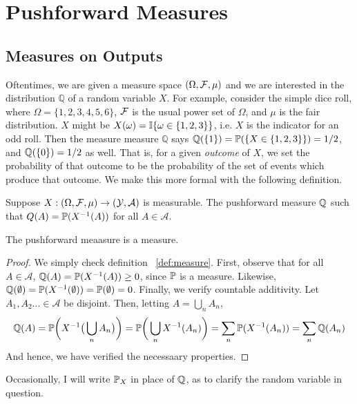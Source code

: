 \section{Pushforward Measures}

\subsection{Measures on Outputs}

Oftentimes, we are given a measure space $ (\Omega, \mathcal F, \mu)$ and we are interested in the distribution $\mathbb Q$ of a random variable $X$.
For example, consider the simple dice roll, where $\Omega = \{1,2,3,4,5,6\}$, $\mathcal F$ is the usual 
power set of $\Omega$, and $\mu$ is the fair distribution. $X$ might be $X(\omega) = \mathbb I\{\omega \in \{1,2,3\}\}$, i.e. 
$X$ is the indicator for an odd roll. Then the measure measure $\mathbb Q$ says $\mathbb Q(\{1\}) = \mathbb P(\{X \in \{1,2,3\} \}) = 1/2$, 
and $\mathbb Q(\{0\}) = 1/2$ as well. That is, for a given \emph{outcome} of $X$, we set the probability of that outcome to 
be the probability of the set of events which produce that outcome. We make this more formal with the following 
definition.

\begin{definition}
    Suppose $X : (\Omega, \mathcal F, \mu) \to (\mathcal Y, \mathcal A)$ is measurable. The pushforward measure $\mathbb Q$ such that $Q(A) = \mathbb P(X^{-1}(A))$ for all 
    $A \in \mathcal A$. 
\end{definition}

\begin{lemma}
    The pushforward meaasure is a measure.
\end{lemma}

\begin{proof} 
    We simply check definition ~\ref{def:measure}. First, observe that 
    for all $A \in \mathcal A$, $\mathbb Q(A) = \mathbb P(X^{-1}(A)) \geq 0$, since 
    $\mathbb P$ is a measure. Likewise, $\mathbb Q(\emptyset) = \mathbb P(X^{-1}(\emptyset)) 
    = \mathbb P(\emptyset) = 0$. Finally, we verify countable additivity. Let 
    $A_1,A_2... \in \mathcal A$ be disjoint. Then, letting $A = \bigcup_n A_n$, 
    \[ \mathbb Q(A) = \mathbb P\bigg(X^{-1}\big(\bigcup_n A_n\big)\bigg) = \mathbb P\bigg(\bigcup_n X^{-1}(A_n)\bigg) = \sum_n \mathbb P(X^{-1}(A_n)) = \sum_n \mathbb Q(A_n) \]
    And hence, we have verified the necessaary properties.
\end{proof}

Occasionally, I will write $\mathbb P_X$ in place of $\mathbb Q$, as to clarify the random variable in question. 

